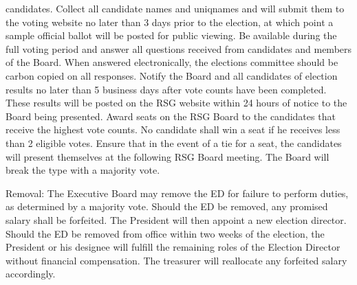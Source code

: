 \begin{enumsubsection}
\begin{enumsubsubsection}
candidates.
\itemnotoc Collect all candidate names and uniqnames and will submit
them to the voting website no later than 3 days prior to the
election, at which point a sample official ballot will be posted for
public viewing.
\itemnotoc Be available during the full voting period and answer all
questions received from candidates and members of the Board.
When answered electronically, the elections committee should
be carbon copied on all responses.
\itemnotoc Notify the Board and all candidates of election results no later
than 5 business days after vote counts have been completed.
These results will be posted on the RSG website within 24
hours of notice to the Board being presented.
\itemnotoc Award seats on the RSG Board to the candidates that receive
the highest vote counts. No candidate shall win a seat if he
receives less than 2 eligible votes.
\itemnotoc Ensure that in the event of a tie for a seat, the candidates will
present themselves at the following RSG Board meeting. The
Board will break the type with a majority vote.
\end{enumsubsubsection}
\item{Removal:} The Executive Board may remove the ED for failure to
perform duties, as determined by a majority vote. Should the ED be
removed, any promised salary shall be forfeited. The President will then
appoint a new election director. Should the ED be removed from office
within two weeks of the election, the President or his designee will fulfill
the remaining roles of the Election Director without financial
compensation. The treasurer will reallocate any forfeited salary
accordingly.
\end{enumsubsection}